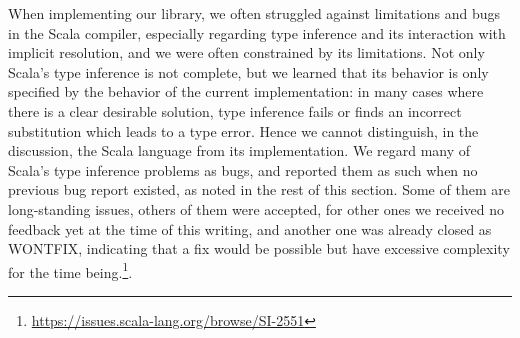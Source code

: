 %
%
%
%


When implementing our library, we often struggled against limitations and bugs in the Scala compiler, especially regarding type inference and its interaction with implicit resolution, and we were often constrained by its limitations. Not only Scala's type inference is not complete, but we learned that its behavior is only specified by the behavior of the current implementation: in many cases where there is a clear desirable solution, type inference fails or finds an incorrect substitution which leads to a type error. Hence we cannot distinguish, in the discussion, the Scala language from its implementation.
We regard many of Scala's type inference problems as bugs, and reported them as such when no previous bug report existed, as noted in the rest of this section. Some of them are long-standing issues, others of them were accepted, for other ones we received no feedback yet at the time of this writing, and another one was already closed as WONTFIX, indicating that a fix would be possible but have excessive complexity for the time being.\footnote{\url{https://issues.scala-lang.org/browse/SI-2551}}.

